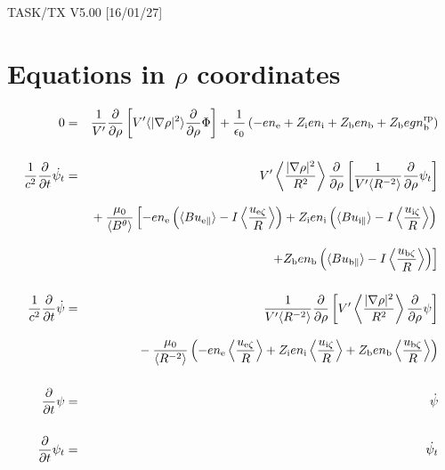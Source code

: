 \documentclass[11pt]{article}
\def\r#1{{\rm#1}}
\def\ave#1{\left\langle#1\right\rangle}
\def\aves#1{\langle#1\rangle}
\def\para{\parallel}
\def\ddrho{\frac{\partial}{\partial\rho}}
\def\gradrho2{\aves{|\nabla\rho|^2}}
\def\psid{\dot{\psi}}
\def\psit{\psi_t}
\def\psitd{\dot{\psit}}
\def\nee{n_\r{e}}
\def\ni{n_\r{i}}
\def\nb{n_\r{b}}
\def\Zi{Z_\r{i}}
\def\Zb{Z_\r{b}}
\def\uezt{u_{\r{e}\zeta}}
\def\uizt{u_{\r{i}\zeta}}
\def\ubzt{u_{\r{b}\zeta}}
\def\uepara{u_{\r{e}\para}}
\def\uipara{u_{\r{i}\para}}
\def\ubpara{u_{\r{b}\para}}
\def\ddt{\frac{\partial}{\partial t}}
\def\nbrp{n_\r{b}^\r{rp}}
\begin{document}
\begin{center}
TASK/TX V5.00 [16/01/27]
\end{center}

\section{Equations in $\rho$ coordinates}
\vspace{-5mm}

%
\begin{eqnarray}
  0 &=&
%
    \frac{1}{V'} \ddrho \left[ V' \gradrho2 \ddrho{\Phi} \right]
%
  + \frac{1}{\epsilon_0}
%
    \left(-e \nee + \Zi e \ni + \Zb e \nb + \Zb e g \nbrp \right)
\\[5mm]
  \frac{1}{c^2} \ddt \psitd &=&
%
    V' \ave{\frac{|\nabla\rho|^2}{R^2}} \ddrho \left[ \frac{1}{V'\aves{R^{-2}}}
				         \ddrho \psit \right] \nonumber\\[3mm]&&{}
%
  + \frac{\mu_0}{\aves{B^\theta}}
%
    \left[-     e \nee \left( \aves{B\uepara} - I\ave{\frac{\uezt}{R}} \right)
          + \Zi e \ni  \left( \aves{B\uipara} - I\ave{\frac{\uizt}{R}} \right)
    \right.\nonumber\\[3mm]&&{}
    \left.+ \Zb e \nb  \left( \aves{B\ubpara} - I\ave{\frac{\ubzt}{R}} \right) \right]
\\[5mm]
  \frac{1}{c^2} \ddt \psid &=&
%
  \frac{1}{V'\aves{R^{-2}}} \ddrho \left[ V'
				    \ave{\frac{|\nabla\rho|^2}{R^2}}
				    \ddrho \psi \right] \nonumber\\[3mm]&&{}
%
  - \frac{\mu_0}{\aves{R^{-2}}} \left(-e \nee \ave{\frac{\uezt}{R}} +
				 \Zi e \ni \ave{\frac{\uizt}{R}} + \Zb e
				 \nb \ave{\frac{\ubzt}{R}} \right)
%
\\[5mm]
  \ddt \psi &=&
%
  \psid
\\[5mm]
  \ddt \psit &=&
%
  \psitd
\end{eqnarray}
%

\end{document}
